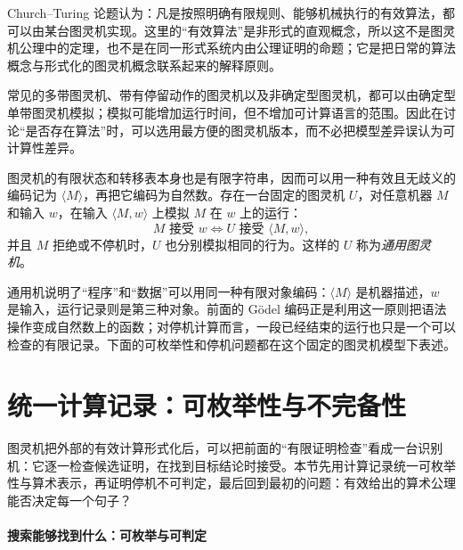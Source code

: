 \documentclass[lang=cn,a4paper,fontset=none,zihao=false,10pt,openany,twoside]{beautybook}
\numberwithin{algorithm}{chapter}
\begin{document}
\begin{remark}
Church--Turing 论题认为：凡是按照明确有限规则、能够机械执行的有效算法，都可以由某台图灵机实现。这里的“有效算法”是非形式的直观概念，所以这不是图灵机公理中的定理，也不是在同一形式系统内由公理证明的命题；它是把日常的算法概念与形式化的图灵机概念联系起来的解释原则。
\end{remark}

常见的多带图灵机、带有停留动作的图灵机以及非确定型图灵机，都可以由确定型单带图灵机模拟；模拟可能增加运行时间，但不增加可计算语言的范围。因此在讨论“是否存在算法”时，可以选用最方便的图灵机版本，而不必把模型差异误认为可计算性差异。

\begin{definition}[通用图灵机]
图灵机的有限状态和转移表本身也是有限字符串，因而可以用一种有效且无歧义的编码记为 $\langle M\rangle$，再把它编码为自然数。存在一台固定的图灵机 $U$，对任意机器 $M$ 和输入 $w$，在输入 $\langle M,w\rangle$ 上模拟 $M$ 在 $w$ 上的运行：
\[
 M\text{ 接受 }w\Longleftrightarrow U\text{ 接受 }\langle M,w\rangle,
\]
并且 $M$ 拒绝或不停机时，$U$ 也分别模拟相同的行为。这样的 $U$ 称为\emph{通用图灵机}。
\end{definition}

通用机说明了“程序”和“数据”可以用同一种有限对象编码：$\langle M\rangle$ 是机器描述，$w$ 是输入，运行记录则是第三种对象。前面的 Gödel 编码正是利用这一原则把语法操作变成自然数上的函数；对停机计算而言，一段已经结束的运行也只是一个可以检查的有限记录。下面的可枚举性和停机问题都在这个固定的图灵机模型下表述。

\section{统一计算记录：可枚举性与不完备性}\label{sec:enumerability}
图灵机把外部的有效计算形式化后，可以把前面的“有限证明检查”看成一台识别机：它逐一检查候选证明，在找到目标结论时接受。本节先用计算记录统一可枚举性与算术表示，再证明停机不可判定，最后回到最初的问题：有效给出的算术公理能否决定每一个句子？

\paragraph{搜索能够找到什么：可枚举与可判定}
\end{document}
